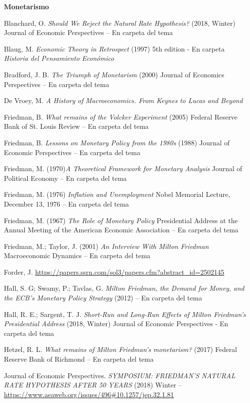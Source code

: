 \documentclass{nuevotema}
\begin{document}
\textbf{{\large Monetarismo}}

Blanchard, O. \textit{Should We Reject the Natural Rate Hypothesis?} (2018, Winter) Journal of Economic Perspectives -- En carpeta del tema

Blaug, M. \textit{Economic Theory in Retrospect} (1997) 5th edition - En carpeta \textit{Historia del Pensamiento Económico}

Bradford, J. B. \textit{The Triumph of Monetarism} (2000) Journal of Economics Perspectives -- En carpeta del tema

De Vroey, M. \textit{A History of Macroeconomics. From Keynes to Lucas and Beyond}

Friedman, B. \textit{What remains of the Volcker Experiment} (2005) Federal Reserve Bank of St. Louis Review -- En carpeta del tema

Friedman, B. \textit{Lessons on Monetary Policy from the 1980s} (1988) Journal of Economic Perspectives -- En carpeta del tema

Friedman, M. (1970)\textit{A Theoretical Framework for Monetary Analysis}  Journal of Political Economy -- En carpeta del tema

Friedman, M. (1976) \textit{Inflation and Unemployment} Nobel Memorial Lecture, December 13, 1976 -- En carpeta del tema

Friedman, M. (1967) \textit{The Role of Monetary Policy}  Presidential Address at the Annual Meeting of the American Economic Association -- En carpeta del tema

Friedman, M.; Taylor, J. (2001) \textit{An Interview With Milton Friedman}  Macroeconomic Dynamics -- En carpeta del tema

Forder, J.  \url{https://papers.ssrn.com/sol3/papers.cfm?abstract_id=2502145}

Hall, S. G; Swamy, P.; Tavlas, G. \textit{Milton Friedman, the Demand for Money, and the ECB’s Monetary Policy Strategy} (2012) -- En carpeta del tema

Hall, R. E.; Sargent, T. J. \textit{Short-Run and Long-Run Effects of
Milton Friedman’s Presidential Address} (2018, Winter) Journal of Economic Perspectives - En carpeta del tema

Hetzel, R. L. \textit{What remains of Milton Friedman's monetarism?} (2017) Federal Reserve Bank of Richmond -- En carpeta del tema

Journal of Economic Perspectives. \textit{SYMPOSIUM: FRIEDMAN'S NATURAL RATE HYPOTHESIS AFTER 50 YEARS} (2018) Winter -- \url{https://www.aeaweb.org/issues/496#10.1257/jep.32.1.81}
\end{document}
